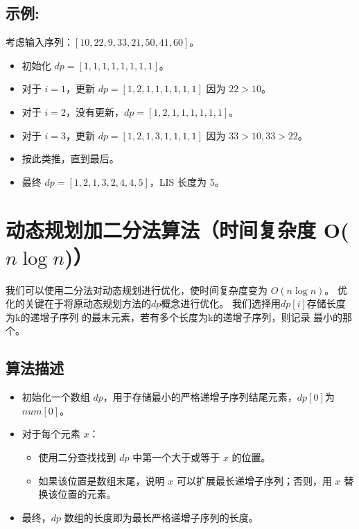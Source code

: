 \documentclass[UTF8]{ctexart}
\begin{document}
\subsection{示例:}
考虑输入序列：\( [10, 22, 9, 33, 21, 50, 41, 60] \)。

\begin{itemize}
    \item 初始化 \( dp = [1, 1, 1, 1, 1, 1, 1, 1] \)。
    \item 对于 \( i = 1 \)，更新 \( dp = [1, 2, 1, 1, 1, 1, 1, 1] \) 因为 \( 22 > 10 \)。
    \item 对于 \( i = 2 \)，没有更新，\( dp = [1, 2, 1, 1, 1, 1, 1, 1] \)。
    \item 对于 \( i = 3 \)，更新 \( dp = [1, 2, 1, 3, 1, 1, 1, 1] \) 因为 \( 33 > 10, 33 > 22 \)。
    \item 按此类推，直到最后。
    \item 最终 \( dp = [1, 2, 1, 3, 2, 4, 4, 5] \)，LIS 长度为 5。
\end{itemize}

\section{动态规划加二分法算法（时间复杂度 O($n \log n$)）}

我们可以使用二分法对动态规划进行优化，使时间复杂度变为 \( O(n \log n) \)。
优化的关键在于将原动态规划方法的\( dp \)概念进行优化。
我们选择用\( dp[i] \)存储长度为k的递增子序列
的最末元素，若有多个长度为k的递增子序列，则记录
最小的那个。
\subsection{算法描述}
\begin{itemize}
    \item 初始化一个数组 \( dp \)，用于存储最小的严格递增子序列结尾元素，\( dp[0] \)为 \(num[0] \)。
    \item 对于每个元素 \( x \)：
    \begin{itemize}
        \item 使用二分查找找到 \( dp \) 中第一个大于或等于 \( x \) 的位置。
        \item 如果该位置是数组末尾，说明 \( x \) 可以扩展最长递增子序列；否则，用 \( x \) 替换该位置的元素。
    \end{itemize}
    \item 最终，\( dp \) 数组的长度即为最长严格递增子序列的长度。
\end{itemize}
\end{document}
